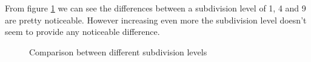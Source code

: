 From figure \ref{fig:subdivison_comparison} we can see the differences between a subdivision level of 1, 4 and 9 are pretty noticeable. However increasing even more the subdivision level doesn't seem to provide any noticeable difference.
\begin{figure}[H]
	\centering
	\qquad
	\qquad
	\qquad
	
	\caption{Comparison between different subdivision levels}%
	\label{fig:subdivison_comparison}%
\end{figure}

